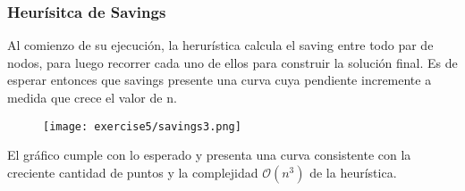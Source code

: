 \subsubsection{Heurísitca de Savings}


Al comienzo de su ejecución, la herurística calcula el saving entre todo par de nodos, para luego recorrer cada uno de ellos para construir la solución final. Es de esperar entonces que savings presente una curva cuya pendiente incremente a medida que crece el valor de n.

\begin{figure}[H]
	\centering
	\texttt{[image: exercise5/savings3.png]}
\end{figure}

El gráfico cumple con lo esperado y presenta una curva consistente con la creciente cantidad de puntos y la complejidad $\mathcal{O}(n^{3})$ de la heurística.